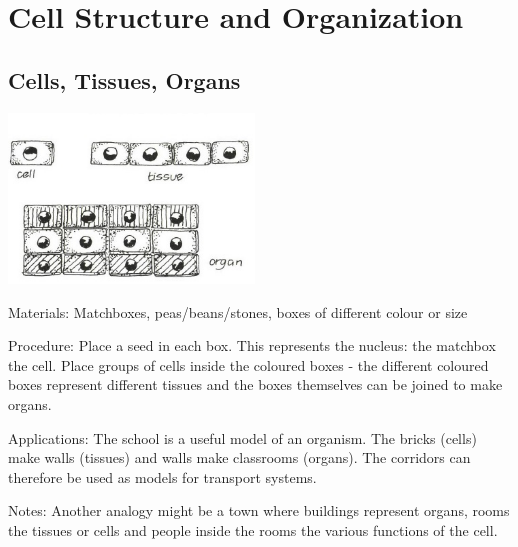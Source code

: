 \section{Cell Structure and Organization}

\begin{multicols}{2}




\subsection{Cells, Tissues, Organs} %

\begin{center}
\includegraphics[width=0.49\textwidth]{./img/vso/cells-tissues-organs.jpg}
\end{center}

\begin{description*}
\item[Materials:]{Matchboxes, peas/beans/stones, boxes of different colour or size}
\item[Procedure:]{Place a seed in each box. This represents the nucleus: the matchbox the
cell. Place groups of cells inside the coloured boxes - the different
coloured boxes represent different tissues and the boxes themselves
can be joined to make organs.}
\item[Applications:]{The school is a useful model of an organism. The bricks (cells) make
walls (tissues) and walls make classrooms (organs). The corridors can
therefore be used as models for transport systems.
}
\item[Notes:]{Another analogy might be a town where buildings represent organs,
rooms the tissues or cells and people inside the rooms the various
functions of the cell.}
\end{description*}


\end{multicols}

